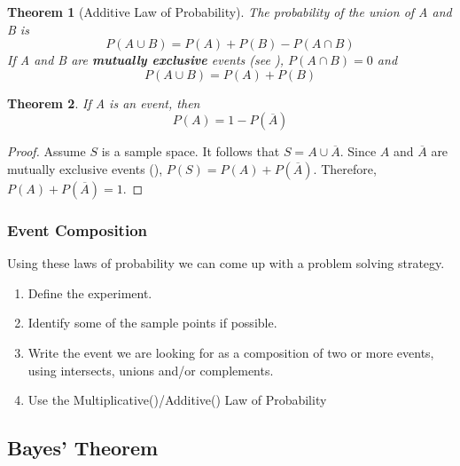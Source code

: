 \documentclass{article}
\theoremstyle{plain}
\newtheorem{thm}{Theorem}[section]
\theoremstyle{definition}
\theoremstyle{remark}
\begin{document}
\begin{thm}[Additive Law of Probability] 
The probability of the union of A and B is
$$
P(A \cup B) = P(A) + P(B) - P(A \cap B)
$$
If A and B are \textbf{mutually exclusive} events (see ), $P(A \cap B) = 0$ and
$$
P(A \cup B) = P(A) + P(B)
$$
\end{thm}
\begin{thm}
If A is an event, then
$$
P(A) = 1 - P(\overline{A})
$$
\end{thm}
\begin{proof}
Assume $S$ is a sample space. It follows that $S = A \cup \overline{A}$. Since $A$ and $\overline{A}$ are mutually exclusive events (), $P(S) = P(A) + P(\overline{A})$. Therefore, $P(A) + P(\overline{A}) = 1$.
\end{proof}

\subsubsection{Event Composition}
Using these laws of probability we can come up with a problem solving strategy.
\begin{enumerate}
\item Define the experiment.
\item Identify some of the sample points if possible.
\item Write the event we are looking for as a composition of two or more events, using intersects, unions and/or complements.
\item Use the Multiplicative()/Additive() Law of Probability
\end{enumerate}


\subsection{Bayes' Theorem}
\end{document}
